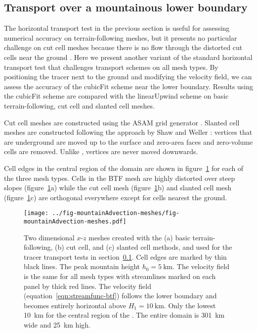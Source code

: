\subsection{Transport over a mountainous lower boundary}
\label{sec:mountainAdvection}

The horizontal transport test in the previous section is useful for assessing numerical accuracy on terrain-following meshes, but it presents no particular challenge on cut cell meshes because there is no flow through the distorted cut cells near the ground \citep{good2014}.
Here we present another variant of the standard horizontal transport test that challenges transport schemes on all mesh types.  By positioning the tracer next to the ground and modifying the velocity field, we can assess the accuracy of the cubicFit scheme near the lower boundary.  Results using the cubicFit scheme are compared with the linearUpwind scheme on basic terrain-following, cut cell and slanted cell meshes.

Cut cell meshes are constructed using the ASAM grid generator \citep{jaehn2015,asam2010}.  Slanted cell meshes are constructed following the approach by Shaw and Weller \citep{shaw-weller2016}: vertices that are underground are moved up to the surface and zero-area faces and zero-volume cells are removed.  Unlike \citep{shaw-weller2016}, vertices are never moved downwards.

  
Cell edges in the central region of the domain are shown in figure~\ref{fig:mountainAdvection-meshes} for each of the three mesh types.
Cells in the BTF mesh are highly distorted over steep slopes (figure~\ref{fig:mountainAdvection-meshes}a) while the cut cell mesh (figure~\ref{fig:mountainAdvection-meshes}b) and slanted cell mesh (figure~\ref{fig:mountainAdvection-meshes}c) are orthogonal everywhere except for cells nearest the ground.

\begin{figure}
	\centering
	\texttt{[image: ../fig-mountainAdvection-meshes/fig-mountainAdvection-meshes.pdf]}
	\caption{Two dimensional $x$-$z$ meshes created with the (a) basic terrain-following, (b) cut cell, and (c) slanted cell methods, and used for the tracer transport tests in section~\ref{sec:mountainAdvection}.  Cell edges are marked by thin black lines.  The peak mountain height $h_0 = \SI{5}{\kilo\meter}$.
The velocity field is the same for all mesh types with streamlines marked on each panel by thick red lines.  The velocity field (equation~\ref{eqn:streamfunc-btf}) follows the lower boundary and becomes entirely horizontal above $H_1 = \SI{10}{\kilo\meter}$.
Only the lowest \SI{10}{\kilo\meter} for the central region of the .  The entire domain is \SI{301}{\kilo\meter} wide and \SI{25}{\kilo\meter} high.}
	\label{fig:mountainAdvection-meshes}
\end{figure}

